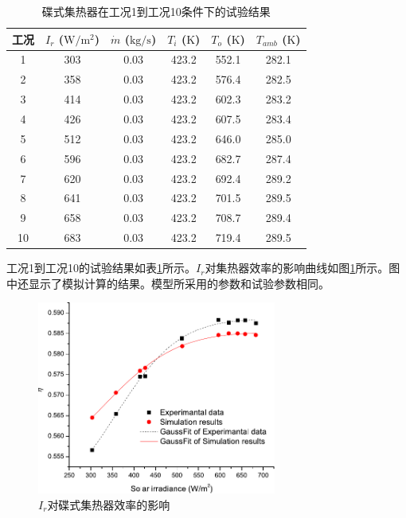 \begin{table}[htbp]\footnotesize
	\caption{碟式集热器在工况1到工况10条件下的试验结果}
	\begin{center}
	\begin{tabular}{cccccc}
		\toprule
		工况	& $I_r$ ($\mathrm{W/m^2}$)	&	$\dot{m}$ ($\mathrm{kg/s}$)			&	$T_i$ ($\mathrm{K}$)	&	$T_o$ ($\mathrm{K}$)		&	$T_{amb}$ ($\mathrm{K}$)\\
		\midrule
		1	&	303	&	0.03	&	423.2	&	552.1	&	282.1\\
		2	&	358	&	0.03	&	423.2	&	576.4	&	282.5\\
		3	&	414	&	0.03	&	423.2	&	602.3	&	283.2	\\
		4	&	426	&	0.03	&	423.2	&	607.5	&	283.4\\
		5	&	512	&	0.03	&	423.2	&	646.0	&	285.0\\
		6	&	596	&	0.03	&	423.2	&	682.7	&	287.4\\
		7	&	620	&	0.03	&	423.2	&	692.4	&	289.2\\
		8	&	641	&	0.03	&	423.2	&	701.5	&	289.5\\
		9	&	658	&	0.03	&	423.2	&	708.7	&	289.4\\
		10	&	683	&	0.03	&	423.2	&	719.4	&	289.5\\
		\bottomrule
	\end{tabular}
	\end{center}
	\label{tab:ResultOfDish1}
\end{table}
工况1到工况10的试验结果如表\ref{tab:ResultOfDish1}所示。$I_r$对集热器效率的影响曲线如图\ref{fig:I_r-eta-dish}所示。图中还显示了模拟计算的结果。模型所采用的参数和试验参数相同。
\begin{figure}[!ht]
\centering
\includegraphics[width=0.7\textwidth]{fig/I_r-eta-dish}
\caption{$I_r$对碟式集热器效率的影响}
\label{fig:I_r-eta-dish}
\end{figure}

